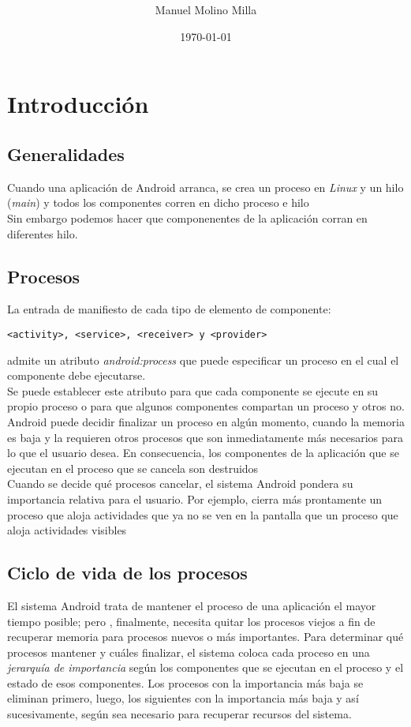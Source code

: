 \documentclass[4paper]{article}
\author{Manuel Molino Milla}
\title{\textbf{\HT}}
\date{\today}
\newcommand{\A}{Android }
\begin{document}
\maketitle 
\tableofcontents
\newpage

\section{Introducción}
\subsection{Generalidades}
Cuando una aplicación de \A arranca, se crea un proceso en \emph{Linux} y un hilo (\emph{main}) y todos los componentes corren en dicho proceso e hilo\\
Sin embargo podemos hacer que componenentes de la aplicación corran en diferentes hilo.
\subsection{Procesos}
La entrada de manifiesto de cada tipo de elemento de componente:
\begin{verbatim}
<activity>, <service>, <receiver> y <provider>
\end{verbatim}
admite un atributo \emph{android:process} que puede especificar un proceso en el cual el componente debe ejecutarse. \\
Se puede establecer este atributo para que cada componente se ejecute en su propio proceso o para que algunos componentes compartan un proceso y otros no.\\
Android puede decidir finalizar un proceso en algún momento, cuando la memoria es baja y la requieren otros procesos que son inmediatamente más necesarios para lo que el usuario desea. En consecuencia, los componentes de la aplicación que se ejecutan en el proceso que se cancela son destruidos\\
Cuando se decide qué procesos cancelar, el sistema Android pondera su importancia relativa para el usuario. Por ejemplo, cierra más prontamente un proceso que aloja actividades que ya no se ven en la pantalla que un proceso que aloja actividades visibles

\subsection{Ciclo de vida de los procesos}
El sistema Android trata de mantener el proceso de una aplicación el mayor tiempo posible; pero , finalmente, necesita quitar los procesos viejos a fin de recuperar memoria para procesos nuevos o más importantes. Para determinar qué procesos mantener y cuáles finalizar, el sistema coloca cada proceso en una \emph{jerarquía de importancia} según los componentes que se ejecutan en el proceso y el estado de esos componentes. Los procesos con la importancia más baja se eliminan primero, luego, los siguientes con la importancia más baja y así sucesivamente, según sea necesario para recuperar recursos del sistema.\\
\end{document}
